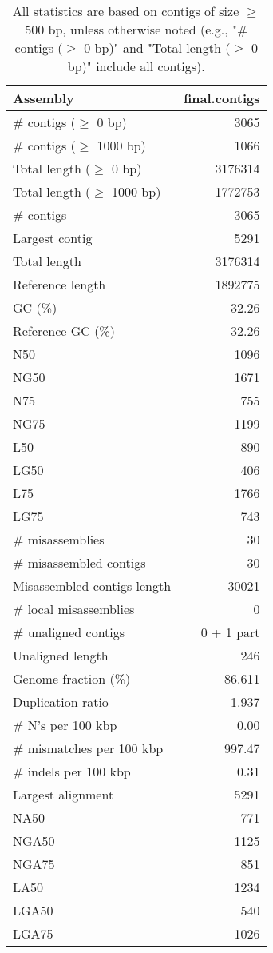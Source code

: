 \documentclass[12pt,a4paper]{article}
\begin{document}
\begin{table}[ht]
\begin{center}
\caption{All statistics are based on contigs of size $\geq$ 500 bp, unless otherwise noted (e.g., "\# contigs ($\geq$ 0 bp)" and "Total length ($\geq$ 0 bp)" include all contigs).}
\begin{tabular}{|l*{1}{|r}|}
\hline
Assembly & final.contigs \\ \hline
\# contigs ($\geq$ 0 bp) & 3065 \\ \hline
\# contigs ($\geq$ 1000 bp) & 1066 \\ \hline
Total length ($\geq$ 0 bp) & 3176314 \\ \hline
Total length ($\geq$ 1000 bp) & 1772753 \\ \hline
\# contigs & 3065 \\ \hline
Largest contig & 5291 \\ \hline
Total length & 3176314 \\ \hline
Reference length & 1892775 \\ \hline
GC (\%) & 32.26 \\ \hline
Reference GC (\%) & 32.26 \\ \hline
N50 & 1096 \\ \hline
NG50 & 1671 \\ \hline
N75 & 755 \\ \hline
NG75 & 1199 \\ \hline
L50 & 890 \\ \hline
LG50 & 406 \\ \hline
L75 & 1766 \\ \hline
LG75 & 743 \\ \hline
\# misassemblies & 30 \\ \hline
\# misassembled contigs & 30 \\ \hline
Misassembled contigs length & 30021 \\ \hline
\# local misassemblies & 0 \\ \hline
\# unaligned contigs & 0 + 1 part \\ \hline
Unaligned length & 246 \\ \hline
Genome fraction (\%) & 86.611 \\ \hline
Duplication ratio & 1.937 \\ \hline
\# N's per 100 kbp & 0.00 \\ \hline
\# mismatches per 100 kbp & 997.47 \\ \hline
\# indels per 100 kbp & 0.31 \\ \hline
Largest alignment & 5291 \\ \hline
NA50 & 771 \\ \hline
NGA50 & 1125 \\ \hline
NGA75 & 851 \\ \hline
LA50 & 1234 \\ \hline
LGA50 & 540 \\ \hline
LGA75 & 1026 \\ \hline
\end{tabular}
\end{center}
\end{table}
\end{document}

